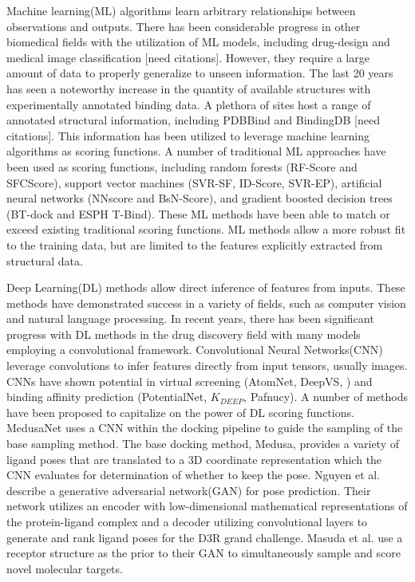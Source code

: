 \documentclass[journal=jcisd8,manuscript=article]{achemso}
\begin{document}
Machine learning(ML) algorithms learn arbitrary relationships between observations and outputs. There has been considerable progress in other biomedical fields with the utilization of ML models, including drug-design and medical image classification [need citations]. However, they require a large amount of data to properly generalize to unseen information. The last 20 years has seen a noteworthy increase in the quantity of available structures with experimentally annotated binding data\cite{}. A plethora of sites host a range of annotated structural information, including PDBBind and BindingDB [need citations]. This information has been utilized to leverage machine learning algorithms as scoring functions. A number of traditional ML approaches have been used as scoring functions, including random forests (RF-Score and SFCScore), support vector machines (SVR-SF, ID-Score, SVR-EP), artificial neural networks (NNscore and BsN-Score), and gradient boosted decision trees (BT-dock and ESPH T-Bind)\cite{liu2017forging,zilian2013sfcscore,li2011svr,li2013idscore,durrant2010nnscore,ashtawy2015bsn,btdock,cang2018integration}. These ML methods have been able to match or exceed existing traditional scoring functions. ML methods allow a more robust fit to the training data, but are limited to the features explicitly extracted from structural data.

Deep Learning(DL) methods allow direct inference of features from inputs. These methods have demonstrated success in a variety of fields, such as computer vision and natural language processing\cite{krizhevsky2017imagenet,brown2020language}. In recent years, there has been significant progress with DL methods in the drug discovery field with many models employing a convolutional framework. Convolutional Neural Networks(CNN) leverage convolutions to infer features directly from input tensors, usually images. CNNs have shown potential in virtual screening (AtomNet, DeepVS, \cite{Ragoza2017}) and binding affinity prediction (PotentialNet, $K_{DEEP}$, Pafnucy)\cite{wallach2015atomnet,jimenez2018k,pereira2016boosting,feinberg2018potentialnet,stepniewska2018development}. A number of methods have been proposed to capitalize on the power of DL scoring functions. MedusaNet uses a CNN within the docking pipeline to guide the sampling of the base sampling method\cite{jiang2020guiding}. The base docking method, Medusa, provides a variety of ligand poses that are translated to a 3D coordinate representation which the CNN evaluates for determination of whether to keep the pose. Nguyen et al. \cite{nguyen2020mathdl} describe a generative adversarial network(GAN) for pose prediction. Their network utilizes an encoder with low-dimensional mathematical representations of the protein-ligand complex and a decoder utilizing convolutional layers to generate and rank ligand poses for the D3R grand challenge. Masuda et al. \cite{masuda2020generating} use a receptor structure as the prior to their GAN to simultaneously sample and score novel molecular targets.
\end{document}
